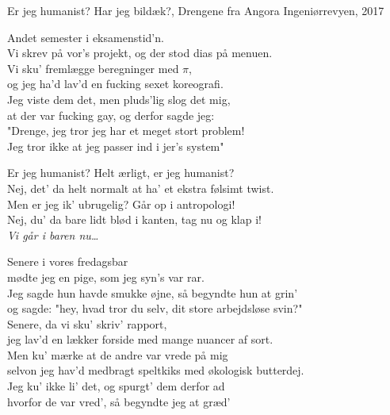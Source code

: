 \begin{song}{Er jeg humanist?}
  {} %
  {Har jeg bildæk?, Drengene fra Angora} %
  {} %
  {Ingeniørrevyen, 2017} %
  {\NotCCLIed} %

  \begin{SBVerse}
    Andet semester i eksamenstid'n.\\
    Vi skrev på vor's projekt, og der stod dias på menuen.\\
    Vi sku' fremlægge beregninger med $\pi$,\\
    og jeg ha'd lav'd en fucking sexet koreografi.\\\medskip
    Jeg viste dem det, men pluds'lig slog det mig,\\
    at der var fucking gay, og derfor sagde jeg:\\
    "Drenge, jeg tror jeg har et meget stort problem!\\
    Jeg tror ikke at jeg passer ind i jer's system"
  \end{SBVerse}

  \begin{SBChorus}
    Er jeg humanist? Helt ærligt, er jeg humanist?\\
    Nej, det' da helt normalt at ha' et ekstra følsimt twist.\\
    Men er jeg ik' ubrugelig? Går op i antropologi!\\
    Nej, du' da bare lidt blød i kanten, tag nu og klap i!\\
    \emph{Vi går i baren nu\ldots}
  \end{SBChorus}

  \begin{SBVerse}
    Senere i vores fredagsbar\\
    mødte jeg en pige, som jeg syn's var rar.\\
    Jeg sagde hun havde smukke øjne, så begyndte hun at grin'\\
    og sagde: "hey, hvad tror du selv, dit store arbejdsløse svin?"\\
    Senere, da vi sku' skriv' rapport,\\
    jeg lav'd en lækker forside med mange nuancer af sort.\\\medskip
    Men ku' mærke at de andre var vrede på mig\\
    selvon jeg hav'd medbragt speltkiks med økologisk butterdej.\\
    Jeg ku' ikke li' det, og spurgt' dem derfor ad\\
    hvorfor de var vred', så begyndte jeg at græd'
  \end{SBVerse}


\end{song}

